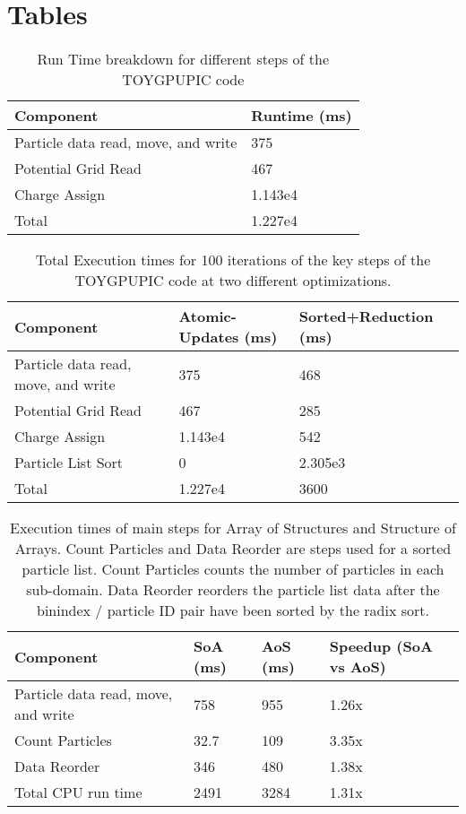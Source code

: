 \chapter{Tables}


\begin{table}[ht]
\begin{tabular}{| p{4.0cm} | p{3.5cm} |}
\hline
Component & Runtime (ms) \\ \hline
Particle data read, move, and write & 375 \\ \hline
Potential Grid Read & 467 \\ \hline
Charge Assign & 1.143e4  \\ \hline
Total & 1.227e4  \\ \hline
\end{tabular}
\caption[TOYGPUPIC Run Time Profile]{Run Time breakdown for different steps of the TOYGPUPIC code}
\label{tab:GPUPIC_basetime} 
\end{table}


\begin{table}[ht]
\begin{tabular}{| p{4.0cm} | p{3.5cm} | p{3.5cm} |}
\hline
Component & Atomic-Updates (ms) & Sorted+Reduction (ms) \\ \hline
Particle data read, move, and write & 375 & 468 \\ \hline
Potential Grid Read & 467 & 285 \\ \hline
Charge Assign & 1.143e4 & 542 \\ \hline
Particle List Sort & 0 & 2.305e3 \\ \hline
Total & 1.227e4 & 3600 \\ \hline
\end{tabular}
\caption[TOYGPUPIC Move Kernel Optimization]{Total Execution times for 100 iterations of the key steps of the TOYGPUPIC code at two different optimizations.}
\label{tab:GPUPIC_comparison}
\end{table}

\begin{table}[ht]
\begin{tabular}{| p{4.0cm} | p{3.5cm} | p{2.5cm} | p{4.0cm} |}
\hline
Component & SoA (ms) & AoS (ms) & Speedup (SoA vs AoS) \\ \hline
Particle data read, move, and write & 758 & 955 & 1.26x \\ \hline
Count Particles & 32.7 & 109 & 3.35x \\ \hline
Data Reorder & 346 & 480 & 1.38x \\ \hline
Total CPU run time & 2491 & 3284 & 1.31x \\ \hline
\end{tabular}
\caption[CPU and GPU Runtime comparison]{Execution times of main steps for Array of Structures and Structure of Arrays. Count Particles and Data Reorder are steps used for a sorted particle list. Count Particles counts the number of particles in each sub-domain. Data Reorder reorders the particle list data after the binindex / particle ID pair have been sorted by the radix sort.}
\label{tab:struct_compare} 
\end{table}

